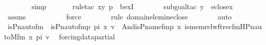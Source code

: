 \begin{isabellebody}
\ \ \ \ \ \ \isamarkupfalse%
\ simp\isanewline
\ \ \ \ \ \ \isamarkupfalse%
{\isacharparenleft}{\kern0pt}rule{\isacharunderscore}{\kern0pt}tac\ x{\isacharequal}{\kern0pt}{\isachardoublequoteopen}{\isacharless}{\kern0pt}y{\isacharcomma}{\kern0pt}\ p{\isachargreater}{\kern0pt}{\isachardoublequoteclose}\ \ bexI{\isacharparenright}{\kern0pt}\isanewline
\ \ \ \ \ \ \ \isamarkupfalse%
{\isacharparenleft}{\kern0pt}subgoal{\isacharunderscore}{\kern0pt}tac\ {\isachardoublequoteopen}y\ {\isasymin}\ eclose{\isacharparenleft}{\kern0pt}x{\isacharparenright}{\kern0pt}{\isachardoublequoteclose}{\isacharparenright}{\kern0pt}\isanewline
\ \ \ \ \ \ \isamarkupfalse%
\ assms{}\ \isanewline
\ \ \ \ \ \ \ \ \isamarkupfalse%
\ force\isanewline
\ \ \ \ \ \ \ \isamarkupfalse%
{\isacharparenleft}{\kern0pt}rule\ domain{\isacharunderscore}{\kern0pt}elem{\isacharunderscore}{\kern0pt}in{\isacharunderscore}{\kern0pt}eclose{\isacharparenright}{\kern0pt}\isanewline
\ \ \ \ \ \ \isamarkupfalse%
\ auto\isanewline
\ \ \isamarkupfalse%
\isanewline
{}\isamarkupfalse%
%
\endisatagproof
{\isafoldproof}%
%
\isadelimproof
\isanewline
%
\endisadelimproof
\isanewline
{}\isamarkupfalse%
\isanewline
\isanewline
{}\isamarkupfalse%
\ is{\isacharunderscore}{\kern0pt}Pn{\isacharunderscore}{\kern0pt}auto{\isacharunderscore}{\kern0pt}fm\ \ {\isachardoublequoteopen}is{\isacharunderscore}{\kern0pt}Pn{\isacharunderscore}{\kern0pt}auto{\isacharunderscore}{\kern0pt}fm{\isacharparenleft}{\kern0pt}p{\isacharcomma}{\kern0pt}\ pi{\isacharcomma}{\kern0pt}\ x{\isacharcomma}{\kern0pt}\ v{\isacharparenright}{\kern0pt}\ {\isasymequiv}\ And{\isacharparenleft}{\kern0pt}is{\isacharunderscore}{\kern0pt}P{\isacharunderscore}{\kern0pt}name{\isacharunderscore}{\kern0pt}fm{\isacharparenleft}{\kern0pt}p{\isacharcomma}{\kern0pt}\ x{\isacharparenright}{\kern0pt}{\isacharcomma}{\kern0pt}\ is{\isacharunderscore}{\kern0pt}memrel{\isacharunderscore}{\kern0pt}wftrec{\isacharunderscore}{\kern0pt}fm{\isacharparenleft}{\kern0pt}HPn{\isacharunderscore}{\kern0pt}auto{\isacharunderscore}{\kern0pt}M{\isacharunderscore}{\kern0pt}fm{\isacharprime}{\kern0pt}{\isacharcomma}{\kern0pt}\ x{\isacharcomma}{\kern0pt}\ pi{\isacharcomma}{\kern0pt}\ v{\isacharparenright}{\kern0pt}{\isacharparenright}{\kern0pt}{\isachardoublequoteclose}\ \isanewline
\isanewline
\isanewline
{}\isamarkupfalse%
\ forcing{\isacharunderscore}{\kern0pt}data{\isacharunderscore}{\kern0pt}partial\ \isanewline

\end{isabellebody}
